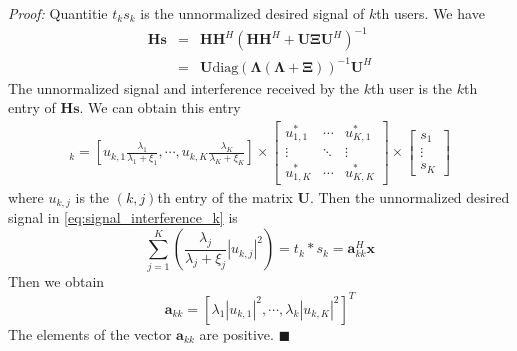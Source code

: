 \documentclass[12pt,journal,draftclsnofoot,onecolumn]{IEEEtran}
\begin{document}
\emph{Proof:} Quantitie $ t_k s_k$ is the unnormalized desired signal of $k$th users. We have 
\begin{eqnarray}
\mathbf{H}\mathbf{s} &=& \mathbf{H}\mathbf{H}^H\left(\mathbf{H}\mathbf{H}^H + \mathbf{U}\mathbf{\Xi}\mathbf{U}^H\right)^{-1}\\
&=&\mathbf{U}\mathrm{diag}(\mathbf{\Lambda}(\mathbf{\Lambda} + \mathbf{\Xi}))^{-1}\mathbf{U}^H \label{eq:Hs}
\end{eqnarray}
The unnormalized signal and interference received by the $k$th user is the
$k$th entry of $\mathbf{H}\mathbf{s}$. We can obtain this	 entry
\begin{eqnarray}
[\mathbf{H}\mathbf{s}]_k = \left[u_{k,1}\frac{\lambda_1}{\lambda_1 + \xi_1}, \cdots, u_{k,K}\frac{\lambda_K}{\lambda_K + \xi_K}\right] \times 
\begin{bmatrix}
u_{1,1}^*  & \cdots & u_{K,1}^* \\
\vdots   & \ddots & \vdots  \\
u_{1,K}^*  & \cdots & u_{K,K}^* 
\end{bmatrix} \times 
\begin{bmatrix}
s_{1}\\
\vdots\\
s_{K} 
\end{bmatrix}
\end{eqnarray} \label{eq:signal_interference_k}
where $u_{k,j}$ is the $(k,j)$th entry of the matrix $\mathbf{U}$. Then the unnormalized desired signal in \eqref{eq:signal_interference_k} is
\begin{equation}
\sum_{j = 1}^{K}\left(\frac{\lambda_j}{\lambda_j + \xi_j}|u_{k,j}|^2\right) = t_k*s_k = \mathbf{a}_{kk}^H\mathbf{x}
\end{equation}
Then we obtain
\begin{equation}
\mathbf{a}_{kk} = \left[\lambda_1|u_{k,1}|^2, \cdots, \lambda_k|u_{k,K}|^2\right]^T
\end{equation}
The elements of the vector $\mathbf{a}_{kk}$ are positive. \hfill$\blacksquare$ 
\end{document}
